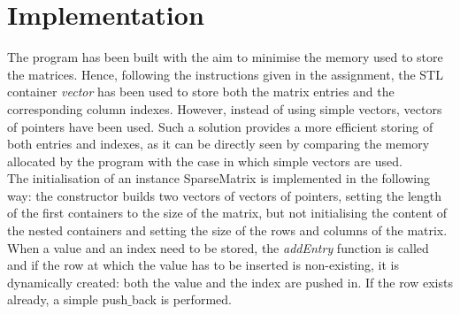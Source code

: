 \documentclass{article}
\theoremstyle{theorem}
\theoremstyle{definition}
\begin{document}
\section{Implementation}
The program has been built with the aim to minimise the memory used to store the matrices. Hence, following the instructions given in the assignment, the STL container \emph{vector} has been used to store both the matrix entries and the corresponding column indexes. However, instead of using simple vectors, vectors of pointers have been used. Such a solution provides a more efficient storing of both entries and indexes, as it can be directly seen by comparing the memory allocated by the program with the case in which simple vectors are used.\\
The initialisation of an instance SparseMatrix is implemented in the following way: the constructor builds two vectors of vectors of pointers, setting the length of the first containers to the size of the matrix, but not initialising the content of the nested containers and setting the size of the rows and columns of the matrix. When a value and an index need to be stored, the \emph{addEntry} function is called and if the row at which the value has to be inserted is non-existing, it is dynamically created: both the value and the index are pushed in. If the row exists already, a simple push$\_$back is performed.\\ 
\end{document}

